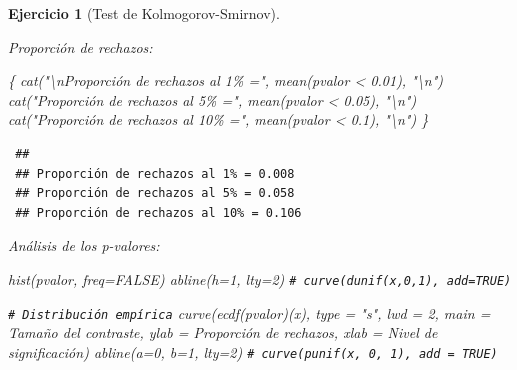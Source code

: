 \documentclass[
]{book}
\newenvironment{Shaded}{\begin{snugshade}}{\end{snugshade}}
\newcommand{\AttributeTok}[1]{\textcolor[rgb]{0.77,0.63,0.00}{#1}}
\newcommand{\CommentTok}[1]{\textcolor[rgb]{0.56,0.35,0.01}{\textit{#1}}}
\newcommand{\ConstantTok}[1]{\textcolor[rgb]{0.00,0.00,0.00}{#1}}
\newcommand{\DecValTok}[1]{\textcolor[rgb]{0.00,0.00,0.81}{#1}}
\newcommand{\FloatTok}[1]{\textcolor[rgb]{0.00,0.00,0.81}{#1}}
\newcommand{\FunctionTok}[1]{\textcolor[rgb]{0.00,0.00,0.00}{#1}}
\newcommand{\NormalTok}[1]{#1}
\newcommand{\SpecialCharTok}[1]{\textcolor[rgb]{0.00,0.00,0.00}{#1}}
\newcommand{\StringTok}[1]{\textcolor[rgb]{0.31,0.60,0.02}{#1}}
\theoremstyle{break}
\newtheorem{exercise}{Ejercicio}[chapter]
\theoremstyle{nonumberplain}
\renewcommand{\CommentTok}[1]{\textcolor[rgb]{0.41,0.41,0.41}{\texttt{#1}}}
\begin{document}
\begin{exercise}[Test de Kolmogorov-Smirnov]
\begin{enumerate}
  Proporción de rechazos:

\begin{Shaded}
\begin{Highlighting}[]
\NormalTok{\{}
  \FunctionTok{cat}\NormalTok{(}\StringTok{"}\SpecialCharTok{\textbackslash{}n}\StringTok{Proporción de rechazos al 1\% ="}\NormalTok{, }\FunctionTok{mean}\NormalTok{(pvalor }\SpecialCharTok{\textless{}} \FloatTok{0.01}\NormalTok{), }\StringTok{"}\SpecialCharTok{\textbackslash{}n}\StringTok{"}\NormalTok{)}
  \FunctionTok{cat}\NormalTok{(}\StringTok{"Proporción de rechazos al 5\% ="}\NormalTok{, }\FunctionTok{mean}\NormalTok{(pvalor }\SpecialCharTok{\textless{}} \FloatTok{0.05}\NormalTok{), }\StringTok{"}\SpecialCharTok{\textbackslash{}n}\StringTok{"}\NormalTok{)}
  \FunctionTok{cat}\NormalTok{(}\StringTok{"Proporción de rechazos al 10\% ="}\NormalTok{, }\FunctionTok{mean}\NormalTok{(pvalor }\SpecialCharTok{\textless{}} \FloatTok{0.1}\NormalTok{), }\StringTok{"}\SpecialCharTok{\textbackslash{}n}\StringTok{"}\NormalTok{)}
\NormalTok{\}}
\end{Highlighting}
\end{Shaded}

\begin{verbatim}
 ## 
 ## Proporción de rechazos al 1% = 0.008 
 ## Proporción de rechazos al 5% = 0.058 
 ## Proporción de rechazos al 10% = 0.106
\end{verbatim}

  Análisis de los p-valores:

\begin{Shaded}
\begin{Highlighting}[]
\FunctionTok{hist}\NormalTok{(pvalor, }\AttributeTok{freq=}\ConstantTok{FALSE}\NormalTok{)}
\FunctionTok{abline}\NormalTok{(}\AttributeTok{h=}\DecValTok{1}\NormalTok{, }\AttributeTok{lty=}\DecValTok{2}\NormalTok{)   }\CommentTok{\# curve(dunif(x,0,1), add=TRUE)}

\CommentTok{\# Distribución empírica}
\FunctionTok{curve}\NormalTok{(}\FunctionTok{ecdf}\NormalTok{(pvalor)(x), }\AttributeTok{type =} \StringTok{"s"}\NormalTok{, }\AttributeTok{lwd =} \DecValTok{2}\NormalTok{, }
      \AttributeTok{main =} \StringTok{\textquotesingle{}Tamaño del contraste\textquotesingle{}}\NormalTok{, }\AttributeTok{ylab =} \StringTok{\textquotesingle{}Proporción de rechazos\textquotesingle{}}\NormalTok{, }
      \AttributeTok{xlab =} \StringTok{\textquotesingle{}Nivel de significación\textquotesingle{}}\NormalTok{)}
\FunctionTok{abline}\NormalTok{(}\AttributeTok{a=}\DecValTok{0}\NormalTok{, }\AttributeTok{b=}\DecValTok{1}\NormalTok{, }\AttributeTok{lty=}\DecValTok{2}\NormalTok{)   }\CommentTok{\# curve(punif(x, 0, 1), add = TRUE) }
\end{Highlighting}
\end{Shaded}


\end{enumerate}
\end{exercise}
\end{document}
